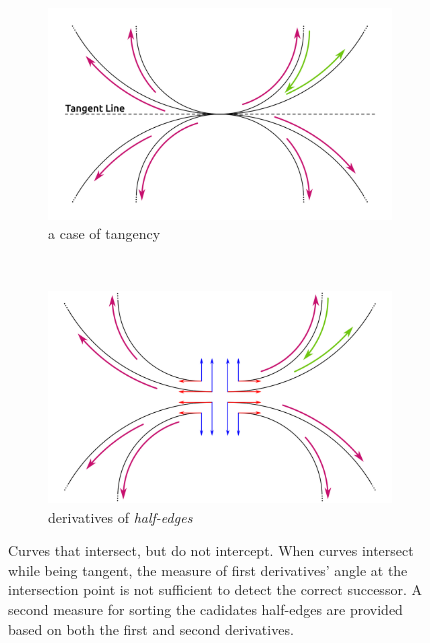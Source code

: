 \begin{figure} %
    \centering
  \begin{subfigure}{.49\textwidth}
    \includegraphics[width=\textwidth]{figures/subd_tangentCase_a.png}
    \caption{a case of tangency} \label{subfig:subd_tangentCase_a}
  \end{subfigure}%
  ~%
  \begin{subfigure}{.49\textwidth}
    \includegraphics[width=\textwidth]{figures/subd_tangentCase_b.png}
    \caption{derivatives of \emph{half-edges}} \label{subfig:subd_tangentCase_b}
  \end{subfigure}%

    \caption{Curves that intersect, but do not intercept.
      When curves intersect while being tangent, the measure of first derivatives' angle at the intersection point is not sufficient to detect the correct successor.
      A second measure for sorting the cadidates half-edges are provided based on both the first and second derivatives.}
    \label{fig:subd_tangentCase}
\end{figure}

